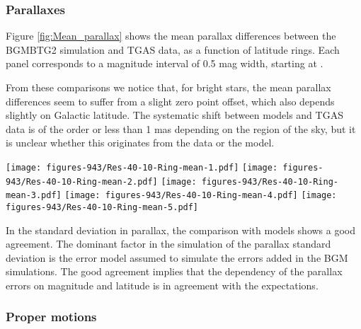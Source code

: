 \subsubsection{Parallaxes}

Figure \ref{fig:Mean_parallax} shows the mean parallax differences between the BGMBTG2 simulation and TGAS data, as a function of latitude rings. Each panel corresponds to a magnitude interval of 0.5 mag width, starting at . 

From these comparisons we notice that, for bright stars, the mean parallax differences seem to suffer from a slight zero point offset, which also depends slightly on Galactic latitude. 
The systematic shift between models and TGAS data is of the order or less than 1 mas depending on the region of the sky, 
but it is unclear whether this originates from the data or the model.

\begin{figure*}
\begin{center}
\texttt{[image: figures-943/Res-40-10-Ring-mean-1.pdf]}
\texttt{[image: figures-943/Res-40-10-Ring-mean-2.pdf]}
\texttt{[image: figures-943/Res-40-10-Ring-mean-3.pdf]}
\texttt{[image: figures-943/Res-40-10-Ring-mean-4.pdf]}
\texttt{[image: figures-943/Res-40-10-Ring-mean-5.pdf]}
\caption{Mean difference in parallax in mas between BGMBTG2 model simulation and TGAS data, in different rings of latitude, for five magnitude bins in \vt\ from left to right, from 9-9.5 (left) to 11-11.5 (right).}
\label{fig:Mean_parallax}
\end{center}
\end{figure*}

In the standard deviation in parallax, the comparison with models shows a good agreement. The dominant factor in the simulation of the parallax standard deviation is the error model assumed to simulate the errors added in the BGM simulations. The good agreement implies that the dependency of the parallax errors on magnitude and latitude is in agreement with the expectations.


\subsubsection{Proper motions}

